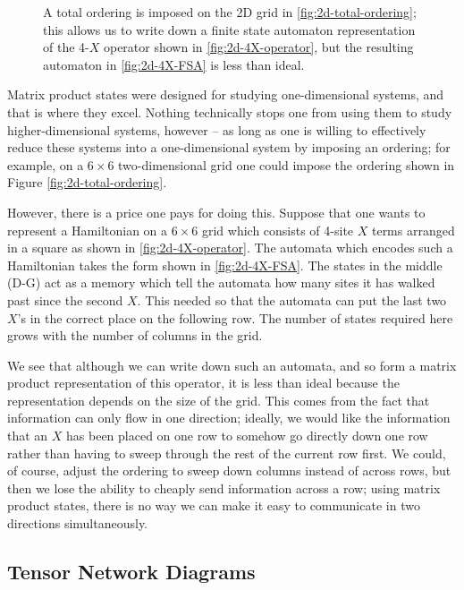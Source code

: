 \documentclass[12pt]{amsbook}
\theoremstyle{plain}
\theoremstyle{definition}
\theoremstyle{remark}
\begin{document}
\begin{figure}
\caption{A total ordering is imposed on the 2D grid in \ref{fig:2d-total-ordering};  this allows us to write down a finite state automaton representation of the 4-$X$ operator shown in \ref{fig:2d-4X-operator}, but the resulting automaton in \ref{fig:2d-4X-FSA} is less than ideal.}
\end{figure}

Matrix product states were designed for studying one-dimensional systems, and that is where they excel.  Nothing technically stops one from using them to study higher-dimensional systems, however -- as long as one is willing to effectively reduce these systems into a one-dimensional system by imposing an ordering; for example, on a $6\times 6$ two-dimensional grid one could impose the ordering shown in Figure \ref{fig:2d-total-ordering}.

However, there is a price one pays for doing this.  Suppose that one wants to represent a Hamiltonian on a $6\times 6$ grid which consists of 4-site $X$ terms arranged in a square as shown in \ref{fig:2d-4X-operator}. The automata which encodes such a Hamiltonian takes the form shown in \ref{fig:2d-4X-FSA}.  The states in the middle (D-G) act as a memory which tell the automata how many sites it has walked past since the second $X$.  This needed so that the automata can put the last two $X$'s in the correct place on the following row.  The number of states required here grows with the number of columns in the grid.

We see that although we can write down such an automata, and so form a matrix product representation of this operator, it is less than ideal because the representation depends on the size of the grid.  This comes from the fact that information can only flow in one direction;  ideally, we would like the information that an $X$ has been placed on one row to somehow go directly down one row rather than having to sweep through the rest of the current row first.  We could, of course, adjust the ordering to sweep down columns instead of across rows, but then we lose the ability to cheaply send information across a row;  using matrix product states, there is no way we can make it easy to communicate in two directions simultaneously.
\subsection{Tensor Network Diagrams}

\label{tensordiagram}
\end{document}
